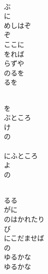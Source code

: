 \documentclass[10pt,b5j]{tarticle} %
\begin{document}
\vspace{1.5em} %
\newcommand{\linespace}{0.5em} %
\newcommand{\blocksize}{0.5\hsize} %
\newcommand{\itemmargin}{6em} %
\begin{enumerate} %
    \setlength{\itemindent}{\itemmargin} %
    \begin{minipage}[c]{\blocksize}
    
        \vspace{\linespace}
        \item~\\
        ぶ\\
        に\\
        めしはぞ\\
        ぞ\\
        ここに\\
        をれば\\
        らずや\\
        のるを\\
        るを
        
        \vspace{\linespace}
        \item~\\
        を\\
        ぶところ\\
        け\\
        の\\
        \\
        にふところ\\
        よ\\
        の\\
        
        \vspace{\linespace}
        \item~\\
        るる\\
        がに\\
        のはかれたり\\
        び\\
        にこだませば\\
        の\\
        ゆるかな\\
        ゆるかな
    
    \end{minipage}
\end{enumerate} %
\end{document}
